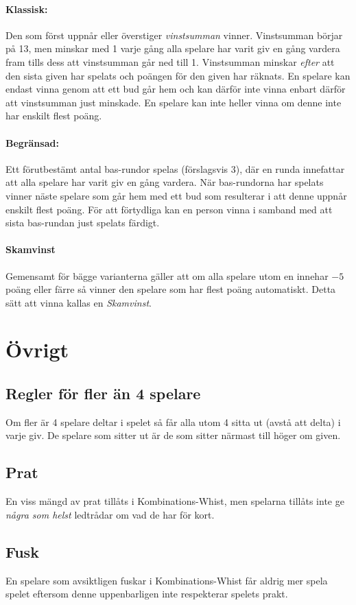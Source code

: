 \documentclass[a4paper]{article}
\begin{document}
				\paragraph{Klassisk:}
					Den som först uppnår eller överstiger \emph{vinstsumman} vinner. Vinstsumman börjar på 13, men minskar med 1 varje gång alla spelare har varit giv en gång vardera fram tills dess att vinstsumman går ned till 1. Vinstsumman minskar \emph{efter} att den sista given har spelats och poängen för den given har räknats. En spelare kan endast vinna genom att ett bud går hem och kan därför inte vinna enbart därför att vinstsumman just minskade. En spelare kan inte heller vinna om denne inte har enskilt flest poäng.

				\paragraph{Begränsad:}
					Ett förutbestämt antal bas-rundor spelas (förslagsvis 3), där en runda innefattar att alla spelare har varit giv en gång vardera. När bas-rundorna har spelats vinner näste spelare som går hem med ett bud som resulterar i att denne uppnår enskilt flest poäng. För att förtydliga kan en person vinna i samband med att sista bas-rundan just spelats färdigt.

				\paragraph{Skamvinst} Gemensamt för bägge varianterna gäller att om alla spelare utom en innehar $-5$ poäng eller färre så vinner den spelare som har flest poäng automatiskt. Detta sätt att vinna kallas en \emph{Skamvinst}.

	\section{Övrigt}
		\subsection{Regler för fler än 4 spelare}
			Om fler är 4 spelare deltar i spelet så får alla utom 4 sitta ut (avstå att delta) i varje giv. De spelare som sitter ut är de som sitter närmast till höger om given.
		
		\subsection{Prat}
			En viss mängd av prat tillåts i Kombinations-Whist, men spelarna tillåts inte ge \emph{några som helst} ledtrådar om vad de har för kort.
		
		\subsection{Fusk}
			En spelare som avsiktligen fuskar i Kombinations-Whist får aldrig mer spela spelet eftersom denne uppenbarligen inte respekterar spelets prakt.

	\pagebreak
	
	
\end{document}
